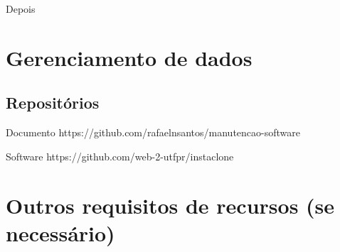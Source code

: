 \pagebreak

Depois


\section{Gerenciamento de dados}

\subsection{Repositórios}
Documento
https://github.com/rafaelnsantos/manutencao-software

Software
https://github.com/web-2-utfpr/instaclone

\section{Outros requisitos de recursos (se necessário)}
